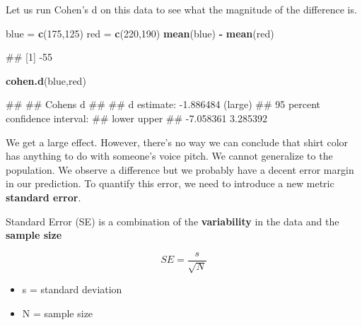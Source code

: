 \documentclass[
]{book}
\newenvironment{Shaded}{\begin{snugshade}}{\end{snugshade}}
\newcommand{\DecValTok}[1]{\textcolor[rgb]{0.00,0.00,0.81}{#1}}
\newcommand{\FunctionTok}[1]{\textcolor[rgb]{0.13,0.29,0.53}{\textbf{#1}}}
\newcommand{\NormalTok}[1]{#1}
\newcommand{\OtherTok}[1]{\textcolor[rgb]{0.56,0.35,0.01}{#1}}
\newcommand{\SpecialCharTok}[1]{\textcolor[rgb]{0.81,0.36,0.00}{\textbf{#1}}}
\providecommand{\tightlist}{%
  \setlength{\itemsep}{0pt}\setlength{\parskip}{0pt}}
\begin{document}
Let us run Cohen's d on this data to see what the magnitude of the difference is.

\begin{Shaded}
\begin{Highlighting}[]
\NormalTok{blue }\OtherTok{=} \FunctionTok{c}\NormalTok{(}\DecValTok{175}\NormalTok{,}\DecValTok{125}\NormalTok{)}
\NormalTok{red }\OtherTok{=} \FunctionTok{c}\NormalTok{(}\DecValTok{220}\NormalTok{,}\DecValTok{190}\NormalTok{)}
\FunctionTok{mean}\NormalTok{(blue) }\SpecialCharTok{{-}} \FunctionTok{mean}\NormalTok{(red)}
\end{Highlighting}
\end{Shaded}

\begin{Shaded}
\begin{Highlighting}[]
\NormalTok{\#\# [1] {-}55}
\end{Highlighting}
\end{Shaded}

\begin{Shaded}
\begin{Highlighting}[]
\FunctionTok{cohen.d}\NormalTok{(blue,red)}
\end{Highlighting}
\end{Shaded}

\begin{Shaded}
\begin{Highlighting}[]
\NormalTok{\#\# }
\NormalTok{\#\# Cohen\textquotesingle{}s d}
\NormalTok{\#\# }
\NormalTok{\#\# d estimate: {-}1.886484 (large)}
\NormalTok{\#\# 95 percent confidence interval:}
\NormalTok{\#\#     lower     upper }
\NormalTok{\#\# {-}7.058361  3.285392}
\end{Highlighting}
\end{Shaded}

We get a large effect. However, there's no way we can conclude that shirt color has anything to do with someone's voice pitch. We cannot generalize to the population. We observe a difference but we probably have a decent error margin in our prediction. To quantify this error, we need to introduce a new metric \textbf{standard error}.

Standard Error (SE) is a combination of the \textbf{variability} in the data and the \textbf{sample size}

\[SE = \frac{s}{\sqrt{N}}\]

\begin{itemize}
\tightlist
\item
  s = standard deviation
\item
  N = sample size
\end{itemize}
\end{document}
